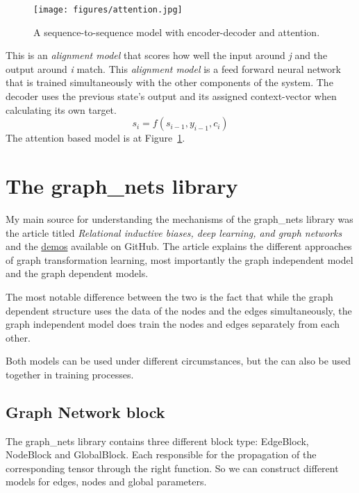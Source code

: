 \begin{figure}[!ht]
	\centering
	\texttt{[image: figures/attention.jpg]}
	\caption{A sequence-to-sequence model with encoder-decoder and attention.}
	\label{fig:attention}
\end{figure}

This is an \textit{alignment model} that scores how well the input around \textit{j} and the output around \textit{i} match. This \textit{alignment model} is a feed forward neural network that is trained simultaneously with the other components of the system.
The decoder uses the previous state's output and its assigned context-vector when calculating its own target.
\[s_i = f(s_{i-1}, y_{i-1}, c_i)\]
The attention based model is at Figure~\ref{fig:attention}.


\section{The graph\_nets library}
My main source for understanding the mechanisms of the graph\_nets library was the article titled \textit{Relational inductive biases, deep learning, and graph networks}\cite{GraphNet} and the \href{https://github.com/deepmind/graph_nets/tree/master/graph_nets/demos}{demos} available on GitHub.
The article explains the different approaches of graph transformation learning, most importantly the graph independent model and the graph dependent models.

The most notable difference between the two is the fact that while the graph dependent structure uses the data of the nodes and the edges simultaneously, the graph independent model does train the nodes and edges separately from each other.

Both models can be used under different circumstances, but the can also be used together in training processes.


\subsection{Graph Network block}
The graph\_nets library contains three different block type: EdgeBlock, NodeBlock and GlobalBlock. Each responsible for the propagation of the corresponding tensor through the right function. So we can construct different models for edges, nodes and global parameters.

